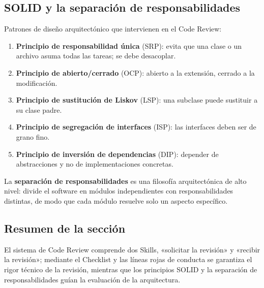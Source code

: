 \subsection{SOLID y la separación de responsabilidades}

Patrones de diseño arquitectónico que intervienen en el Code Review:

\begin{enumerate}
    \item \textbf{Principio de responsabilidad única} (SRP): evita que una clase o un archivo asuma todas las tareas; se debe desacoplar.
    \item \textbf{Principio de abierto/cerrado} (OCP): abierto a la extensión, cerrado a la modificación.
    \item \textbf{Principio de sustitución de Liskov} (LSP): una subclase puede sustituir a su clase padre.
    \item \textbf{Principio de segregación de interfaces} (ISP): las interfaces deben ser de grano fino.
    \item \textbf{Principio de inversión de dependencias} (DIP): depender de abstracciones y no de implementaciones concretas.
\end{enumerate}

La \textbf{separación de responsabilidades} es una filosofía arquitectónica de alto nivel: divide el software en módulos independientes con responsabilidades distintas, de modo que cada módulo resuelve solo un aspecto específico.

\subsection{Resumen de la sección}

El sistema de Code Review comprende dos Skills, «solicitar la revisión» y «recibir la revisión»; mediante el Checklist y las líneas rojas de conducta se garantiza el rigor técnico de la revisión, mientras que los principios SOLID y la separación de responsabilidades guían la evaluación de la arquitectura.

